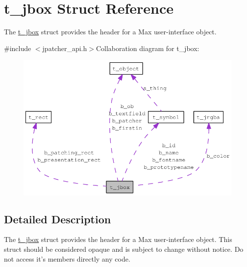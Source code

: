 \hypertarget{structt__jbox}{
\section{t\_\-jbox Struct Reference}
\label{structt__jbox}
}


The \hyperlink{structt__jbox}{t\_\-jbox} struct provides the header for a Max user-\/interface object.  


{\ttfamily \#include $<$jpatcher\_\-api.h$>$}Collaboration diagram for t\_\-jbox:\nopagebreak
\begin{figure}[H]
\begin{center}
\leavevmode
\includegraphics[width=400pt]{structt__jbox__coll__graph}
\end{center}
\end{figure}


\subsection{Detailed Description}
The \hyperlink{structt__jbox}{t\_\-jbox} struct provides the header for a Max user-\/interface object. This struct should be considered opaque and is subject to change without notice. Do not access it's members directly any code. 